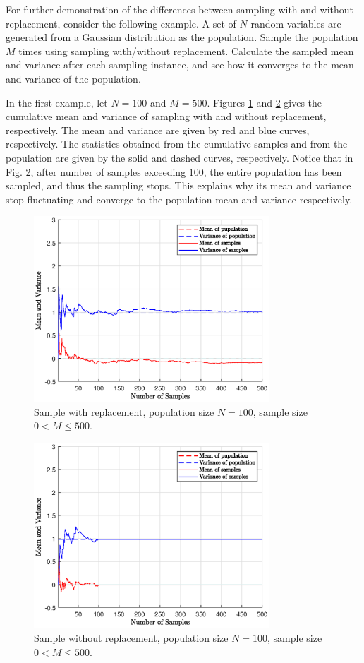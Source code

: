 For further demonstration of the differences between sampling with and without replacement, consider the following example. A set of $N$ random variables are generated from a Gaussian distribution as the population. Sample the population $M$ times using sampling with/without replacement. Calculate the sampled mean and variance after each sampling instance, and see how it converges to the mean and variance of the population.

In the first example, let $N=100$ and $M=500$. Figures \ref{ch:sampling:fig:sample-wr-n100} and \ref{ch:sampling:fig:sample-nwr-n100} gives the cumulative mean and variance of sampling with and without replacement, respectively. The mean and variance are given by red and blue curves, respectively. The statistics obtained from the cumulative samples and from the population are given by the solid and dashed curves, respectively. Notice that in Fig. \ref{ch:sampling:fig:sample-nwr-n100}, after number of samples exceeding $100$, the entire population has been sampled, and thus the sampling stops. This explains why its mean and variance stop fluctuating and converge to the population mean and variance respectively.

\begin{figure}
	\centering
	\includegraphics[width=250pt]{chapters/ch-sampling/figures/sample-wr-n100.eps}
	\caption{Sample with replacement, population size $N=100$, sample size $0< M\leq500$.} \label{ch:sampling:fig:sample-wr-n100}
\end{figure}

\begin{figure}
	\centering
	\includegraphics[width=250pt]{chapters/ch-sampling/figures/sample-nwr-n100.eps}
	\caption{Sample without replacement, population size $N=100$, sample size $0< M\leq500$.} \label{ch:sampling:fig:sample-nwr-n100}
\end{figure}

